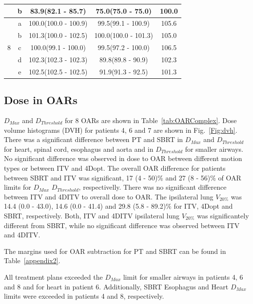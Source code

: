 \documentclass[type=dr, dr=rernat, accentcolor=tud7b,colorbacktitle, bigchapter, openright, twoside, 12pt ]{tudthesis}
\begin{document}
\begin{table}[H]
\begin{tabular}{c|c|c|c|c}
 & b & 83.9(82.1 - 85.7) & 75.0(75.0 - 75.0) & 100.0\\ 
 \hline
\multirow{5}{*}{8} & a & 100.0(100.0 - 100.9) & 99.5(99.1 - 100.9) & 105.6\\ 
 & b & 101.3(100.0 - 102.5) & 100.0(100.0 - 101.3) & 105.0\\ 
 & c & 100.0(99.1 - 100.0) & 99.5(97.2 - 100.0) & 106.5\\ 
 & d & 102.3(102.3 - 102.3) & 89.8(89.8 - 90.9) & 102.3\\ 
 & e & 102.5(102.5 - 102.5) & 91.9(91.3 - 92.5) & 101.3\\ 
\hline\hline
	\end{tabular}
	\label{tab:resultsComplex}
\end{table}

\subsection{Dose in OARs}

$D_{Max}$ and $D_{Threshold}$ for 8 OARs are shown in Table~\ref{tab:OARComplex}. Dose volume histograms (DVH) for patients 4, 6 and 7 are shown in Fig.~\ref{Fig:dvh}.
There was a significant difference between PT and SBRT in $D_{Max}$ and $D_{Threshold}$ 
for heart, spinal cord, esophagus and aorta and in $D_{Threshold}$ for smaller airways.
No significant difference was observed in dose to OAR between different motion types or between ITV and 4Dopt.
The overall OAR difference for patients between SBRT and ITV
was significant, 17 (4 - 50)\% and 27 (8 - 56)\% of OAR limits for $D_{Max}$ $D_{Threshold}$, respectivelly. There was no significant difference between ITV and 4DITV to overall dose to OAR.
The ipsilateral lung $V_{20\%}$ was 14.4 (0.0 - 43.0), 14.6 (0.0 - 41.4) and 29.8 (5.8 - 89.2)\% for ITV, 4Dopt and SBRT, respectively. Both, ITV and 4DITV ipsilateral lung $V_{20\%}$ was
significantely different from SBRT, while no significant difference was observed between ITV and 4DITV.

The margins used for OAR subtraction for PT and SBRT can be found in Table~\ref{appendix2}.

All treatment plans exceeded the $D_{Max}$ limit for smaller airways in patients 4, 6 and 8 and for heart in patient 6. 
Additionally, SBRT Esophagus and Heart $D_{Max}$ limits were exceeded in patients 4 and 8, respectively.
\end{document}
